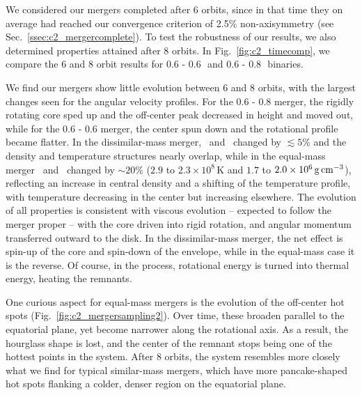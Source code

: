 We considered our mergers completed after 6 orbits, since in that time they on average had reached our convergence criterion of 2.5\% non-axisymmetry (see Sec.~\ref{ssec:c2_mergercomplete}).  To test the robustness of our results, we also determined properties attained after 8 orbits.  In Fig.~\ref{fig:c2_timecomp}, we compare the 6 and 8 orbit results for 0.6 - 0.6\,\Msun\ and 0.6 - 0.8\,\Msun\ binaries.

We find our mergers show little evolution between 6 and 8 orbits, with the largest changes seen for the angular velocity profiles.  For the 0.6 - 0.8 {\Msun} merger, the rigidly rotating core sped up and the off-center peak decreased in height and moved out, while for the 0.6 - 0.6 {\Msun} merger, the center spun down and the rotational profile became flatter.  In the dissimilar-mass merger, \Tmax\ and \rhoTmax\ changed by $\lesssim\!5$\% and the density and temperature structures nearly overlap, while in the equal-mass merger \Tmax\ and \rhoTmax\ changed by $\sim\!20$\% ($2.9$ to $2.3\times10^8\,$K and $1.7$ to $2.0\times10^6\,\gcc$), reflecting an increase in central density and a shifting of the temperature profile, with temperature decreasing in the center but increasing elsewhere.  The evolution of all properties is consistent with viscous evolution -- expected to follow the merger proper -- with the core driven into rigid rotation, and angular momentum transferred outward to the disk.  In the dissimilar-mass merger, the net effect is spin-up of the core and spin-down of the envelope, while in the equal-mass case it is the reverse.  Of course, in the process, rotational energy is turned into thermal energy, heating the remnants.

One curious aspect for equal-mass mergers is the evolution of the off-center hot spots (Fig.~\ref{fig:c2_mergersampling2}).  Over time, these broaden parallel to the equatorial plane, yet become narrower along the rotational axis.  As a result, the hourglass shape is lost, and the center of the remnant stops being one of the hottest points in the system.  After 8 orbits, the system resembles more closely what we find for typical similar-mass mergers, which have more pancake-shaped hot spots flanking a colder, denser region on the equatorial plane.


